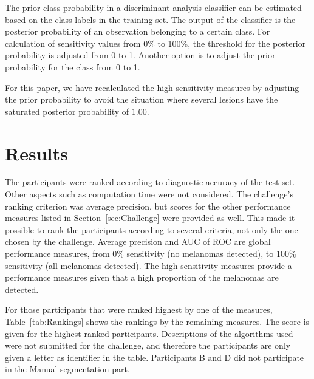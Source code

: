 \documentclass[a4paper,12pt]{article}
\begin{document}
The prior class probability in a discriminant analysis classifier can be estimated based on the class labels in the training set. The output of the classifier is the posterior probability of an observation belonging to a certain class. For calculation of sensitivity values from 0\% to 100\%, the threshold for the posterior probability is adjusted from 0 to 1. Another option is to adjust the prior probability for the class from 0 to 1. 

For this paper, we have recalculated the high-sensitivity measures by adjusting the prior probability to avoid the situation where several lesions have the saturated posterior probability of $1.00$. 

\section{Results} \label{sec:Results}

The participants were ranked according to diagnostic accuracy of the test set. 
Other aspects such as computation time were not considered.
The challenge's ranking criterion was average precision, but scores for the other performance measures listed in Section~\ref{sec:Challenge} were provided as well.  
This made it possible to rank the participants according to several criteria, not only the one chosen by the challenge. 
Average precision and AUC of ROC are global performance measures, from $0\%$ sensitivity (no melanomas detected), to $100\%$ sensitivity (all melanomas detected). 
The high-sensitivity measures provide a performance measures given that a high proportion of the melanomas are detected. 

For those participants that were ranked highest by one of the measures, Table~\ref{tab:Rankings} shows the rankings
by the remaining measures. 
The score is given for the highest ranked participants. 
Descriptions of the algorithms used were not submitted for the challenge, and therefore the participants are only given a letter as identifier in the table. 
Participants B and D did not participate in the Manual segmentation part. 
\end{document}
